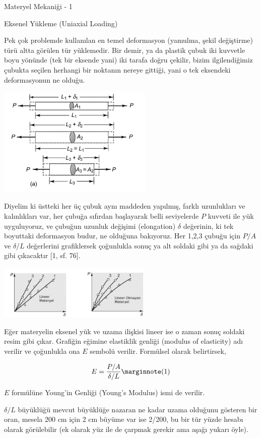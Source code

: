 \documentclass[12pt,fleqn]{article}\usepackage{../../common}
\begin{document}
Materyel Mekaniği - 1

Eksenel Yükleme (Uniaxial Loading)

Pek çok problemde kullanılan en temel deformasyon (yamulma, şekil değiştirme)
türü altta görülen tür yüklemedir. Bir demir, ya da plastik çubuk iki kuvvetle
boyu yönünde (tek bir eksende yani) iki tarafa doğru çekilir, bizim
ilgilendiğimiz çubukta seçilen herhangi bir noktanın nereye gittiği, yani o tek
eksendeki deformasyonun ne olduğu.

\includegraphics[width=20em]{phy_020_strs_01_10.jpg}

Diyelim ki üstteki her üç çubuk aynı maddeden yapılmış, farklı uzunlukları ve
kalınlıkları var, her çubuğa sıfırdan başlayarak belli seviyelerde $P$ kuvveti
ile yük uyguluyoruz, ve çubuğun uzunluk değişimi (elongation) $\delta$
değerinin, ki tek boyuttaki deformasyon budur, ne olduğuna bakıyoruz. Her 1,2,3
çubuğu için $P/A$ ve $\delta/L$ değerlerini grafiklersek çoğunlukla sonuç ya alt
soldaki gibi ya da sağdaki gibi çıkacaktır [1, sf. 76].

\includegraphics[width=20em]{phy_020_strs_00_02.jpg}

Eğer materyelin eksenel yük ve uzama ilişkisi lineer ise o zaman sonuç soldaki
resim gibi çıkar. Grafiğin eğimine elastiklik genliği (modulus of elasticity)
adı verilir ve çoğunlukla ona $E$ sembolü verilir. Formülsel olarak belirtirsek,

$$
E = \frac{P/A}{\delta / L}
\mlabel{1}
$$

$E$ formülüne Young'in Genliği (Young's Modulus) ismi de verilir. 

$\delta/L$ büyüklüğü mevcut büyüklüğe nazaran ne kadar uzama olduğunu gösteren
bir oran, mesela 200 cm için 2 cm büyüme var ise 2/200, bu bir tür yüzde hesabı
olarak görülebilir (ek olarak yüz ile de çarpmak gerekir ama aşağı yukarı öyle).
\end{document}
